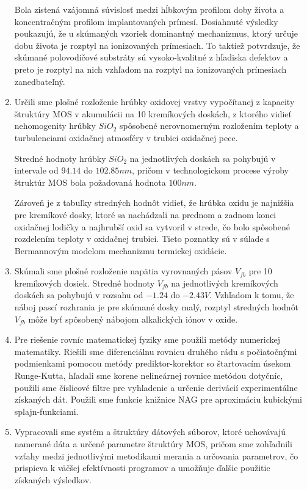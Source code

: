 \begin{enumerate}
  \newline
  Bola zistená vzájomná súvislosť medzi hĺbkovým profilom doby života
  a koncentračným profilom implantovaných prímesí. Dosiahnuté výsledky
  poukazujú, že u skúmaných vzoriek dominantný mechanizmus, ktorý
  určuje dobu života je rozptyl na ionizovaných prímesiach. To taktiež
  potvrdzuje, že skúmané polovodičové substráty sú vysoko-kvalitné z
  hľadiska defektov a preto je rozptyl na nich vzhľadom na rozptyl na
  ionizovaných prímesiach zanedbateľný.

\item Určili sme plošné rozloženie hrúbky oxidovej vrstvy vypočítanej
  z kapacity štruktúry MOS v akumulácii na 10 kremíkových doskách, z
  ktorého vidieť nehomogenity hrúbky $SiO_{2}$ spôsobené nerovnomerným
  rozložením teploty a turbulenciami oxidačnej atmosféry v trubici
  oxidačnej pece.
  
  \newline
  Stredné hodnoty hrúbky $SiO_{2}$ na jednotlivých doskách sa pohybujú
  v intervale od $94.14$ do $102.85nm$, pričom v technologickom
  procese výroby štruktúr MOS bola požadovaná hodnota $100 nm$.

  \newline
  Zároveň je z tabuľky stredných hodnôt vidieť, že hrúbka oxidu je
  najnižšia pre kremíkové dosky, ktoré sa nachádzali na prednom a
  zadnom konci oxidačnej lodičky a najhrubší oxid sa vytvoril v
  strede, čo bolo spôsobené rozdelením teploty v oxidačnej
  trubici. Tieto poznatky sú v súlade s Bermannovým modelom mechanizmu
  termickej oxidácie.

\item Skúmali sme plošné rozloženie napätia vyrovnaných pásov $V_{fb}$
  pre 10 kremíkových dosiek. Stredné hodnoty $V_{fb}$ na jednotlivých
  kremíkových doskách sa pohybujú v rozsahu od $-1.24$ do $-2.43
  V$. Vzhľadom k tomu, že náboj pascí rozhrania je pre skúmané dosky
  malý, rozptyl stredných hodnôt $V_{fb}$ môže byť spôsobený nábojom
  alkalických iónov v oxide.

\item Pre riešenie rovníc matematickej fyziky sme použili metódy
  numerickej matematiky. Riešili sme diferenciálnu rovnicu druhého
  rádu s počiatočnými podmienkami pomocou metódy prediktor-korektor so
  štartovacím úsekom Runge-Kutta, hľadali sme korene nelineárnej
  rovnice metódou dotyčníc, použili sme číslicové filtre pre
  vyhladenie a určenie derivácií experimentálne získaných dát. Použili
  sme funkcie knižnice NAG pre aproximáciu kubickými splajn-funkciami.

\item Vypracovali sme systém a štruktúry dátových súborov, ktoré
  uchovávajú namerané dáta a určené parametre štruktúry MOS, pričom
  sme zohľadnili vzťahy medzi jednotlivými metodikami merania a
  určovania parametrov, čo prispieva k väčšej efektívnosti programov a
  umožňuje ďalšie použitie získaných výsledkov.

\end{enumerate}
